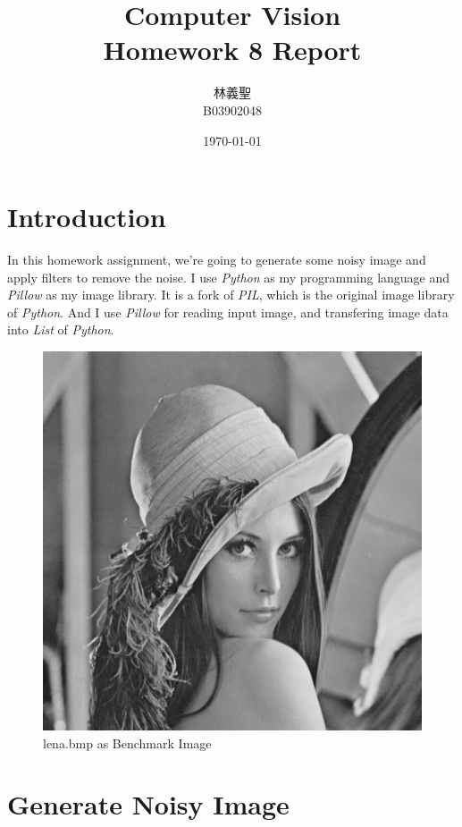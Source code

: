 \documentclass[14pt,a4paper]{extarticle}
\title{{\optima Computer Vision\\Homework 8 Report}}
\author{林義聖\\B03902048}
\date{\today}
\begin{document}
\maketitle
\thispagestyle{fancy}

\section{Introduction}

In this homework assignment, we're going to generate some noisy image and apply filters to remove the noise. I use \textit{Python} as my programming language and \textit{Pillow} as my image library. It is a fork of \textit{PIL}, which is the original image library of \textit{Python}. And I use \textit{Pillow} for reading input image, and transfering image data into \textit{List} of \textit{Python}.

\begin{figure}[H]
\centering
\includegraphics[scale=0.5]{lena.bmp}
\caption{lena.bmp as Benchmark Image}
\label{fig:lena.bmp}
\end{figure}

\section{Generate Noisy Image}
\end{document}
